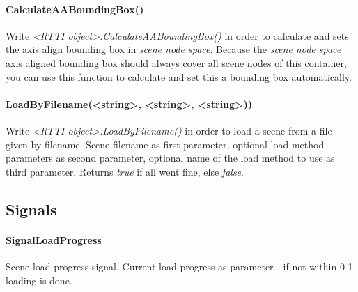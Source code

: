 \paragraph{CalculateAABoundingBox()}
Write \emph{<RTTI object>:CalculateAABoundingBox()} in order to calculate and sets the axis align bounding box in \emph{scene node space}. Because the \emph{scene node space} axis aligned bounding box should always cover all scene nodes of this container, you can use this function to calculate and set this a bounding box automatically.

\paragraph{LoadByFilename(<string>, <string>, <string>))}
Write \emph{<RTTI object>:LoadByFilename()} in order to load a scene from a file given by filename. Scene filename as first parameter, optional load method parameters as second parameter, optional name of the load method to use as third parameter. Returns \emph{true} if all went fine, else \emph{false}.


\subsection{Signals}

\paragraph{SignalLoadProgress}
Scene load progress signal. Current load progress as parameter - if not within 0-1 loading is done.
